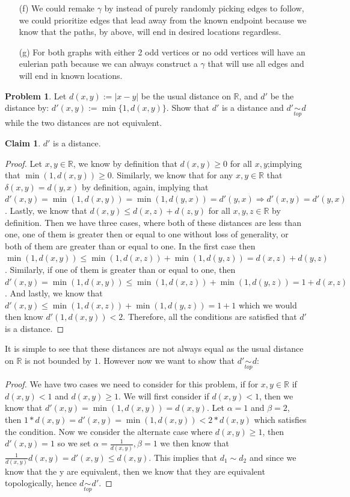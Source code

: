 \documentclass[11pt]{article}
\theoremstyle{definition}
\newtheorem{problem}{Problem}
\newtheorem*{claim}{Claim}
\newcommand{\R}{\mathbb{R}}
\renewcommand{\d}{\delta}
\begin{document}
\begin{enumerate}
        \item [(f)] We could remake $\gamma$ by instead of purely randomly picking edges to follow, we could prioritize edges that lead away from the known endpoint because we know that the paths, by above, will end in desired locations regardless.
        \item [(g)] For both graphs with either 2 odd vertices or no odd vertices will have an eulerian path because we can always construct a $\gamma$ that will use all edges and will end in known locations.
    \end{enumerate}
\clearpage

\begin{problem}
Let $d(x, y) := |x - y|$ be the usual distance on $\R$, and $d'$ be the distance by: $d'(x, y) := \min\{1, d(x, y)\}.$ Show that $d'$ is a distance and $d' \underset{top}{\sim} d$ while the two distances are not equivalent.
\end{problem}
\begin{claim}
$d'$ is a distance.
\end{claim}
\begin{proof}
    Let $x, y\in \R$, we know by definition that $d(x, y) \geq 0$ for all $x, y$;implying that $\min(1, d(x, y)) \geq 0$. Similarly, we know that for any $x, y\in \R$ that $\d(x, y) = d(y, x)$ by definition, again, implying that $d'(x, y) = \min(1, d(x, y)) = \min(1, d(y, x)) = d'(y, x) \Rightarrow d'(x, y) = d'(y, x)$. Lastly, we know that $d(x, y) \leq d(x, z) + d(z, y)$ for all $x, y, z \in \R$ by definition. Then we have three cases, where both of these distances are less than one, one of them is greater then or equal to one without loss of generality, or both of them are greater than or equal to one. In the first case then $\min(1, d(x, y)) \leq \min(1, d(x, z)) + \min(1, d(y, z)) = d(x, z) + d(y, z)$. Similarly, if one of them is greater than or equal to one, then $d'(x, y) = \min(1, d(x, y)) \leq \min(1, d(x, z)) + \min(1, d(y, z)) = 1 + d(x, z)$. And lastly, we know that $d'(x, y) \leq \min(1, d(x, z)) + \min(1, d(y, z)) = 1 + 1$ which we would then know $d'(1, d(x, y)) < 2$. Therefore, all the conditions are satisfied that $d'$ is a distance.
\end{proof}
It is simple to see that these distances are not always equal as the usual distance on $\R$ is not bounded by $1$. However now we want to show that $d' \underset{top}{\sim} d$:
\begin{proof}
    We have two cases we need to consider for this problem, if for $x, y\in \R$ if $d(x, y) < 1$ and $d(x, y) \geq 1$. We will first consider if $d(x, y) < 1$, then we know that $d'(x, y) = \min(1, d(x, y)) = d(x, y)$. Let $\alpha = 1$ and $\beta = 2$, then $1 * d(x, y) = d'(x, y) = \min(1, d(x, y)) < 2*d(x, y)$ which satisfies the condition. Now we consider the alternate case where $d(x, y) \geq 1$, then $d'(x, y) = 1$ so we set $\alpha = \frac{1}{d(x, y)}, \beta = 1$ we then know that $\frac{1}{d(x, y)}d(x,y) = d'(x, y) \leq d(x,y)$. This implies that $d_1 \sim d_2$ and since we know that the y are equivalent, then we know that they are equivalent topologically, hence $d \underset{top}{\sim} d'.$
\end{proof}
\clearpage
\end{document}
